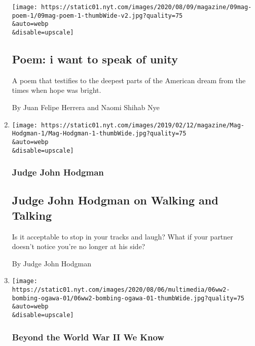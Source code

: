 \begin{enumerate}
  \texttt{[image: https://static01.nyt.com/images/2020/08/09/magazine/09mag-poem-1/09mag-poem-1-thumbWide-v2.jpg?quality=75\\\&auto=webp\\\&disable=upscale]}

  \hypertarget{poem-i-want-to-speak-of-unity}{%
  \subsection{Poem: i want to speak of
  unity}\label{poem-i-want-to-speak-of-unity}}

  A poem that testifies to the deepest parts of the American dream from
  the times when hope was bright.

  By Juan Felipe Herrera and Naomi Shihab Nye
\item
  \href{/2020/08/06/magazine/judge-john-hodgman-on-walking-and-talking.html}{}

  \texttt{[image: https://static01.nyt.com/images/2019/02/12/magazine/Mag-Hodgman-1/Mag-Hodgman-1-thumbWide.jpg?quality=75\\\&auto=webp\\\&disable=upscale]}

  \hypertarget{judge-john-hodgman}{%
  \subsubsection{Judge John Hodgman}\label{judge-john-hodgman}}

  \hypertarget{judge-john-hodgman-on-walking-and-talking}{%
  \subsection{Judge John Hodgman on Walking and
  Talking}\label{judge-john-hodgman-on-walking-and-talking}}

  Is it acceptable to stop in your tracks and laugh? What if your
  partner doesn't notice you're no longer at his side?

  By Judge John Hodgman
\item
  \href{/2020/08/06/magazine/hiroshima-nagasaki-japan-literature.html}{}

  \texttt{[image: https://static01.nyt.com/images/2020/08/06/multimedia/06ww2-bombing-ogawa-01/06ww2-bombing-ogawa-01-thumbWide.jpg?quality=75\\\&auto=webp\\\&disable=upscale]}

  \hypertarget{beyond-the-world-war-ii-we-know}{%
  \subsubsection{Beyond the World War II We
  Know}\label{beyond-the-world-war-ii-we-know}}


\end{enumerate}
